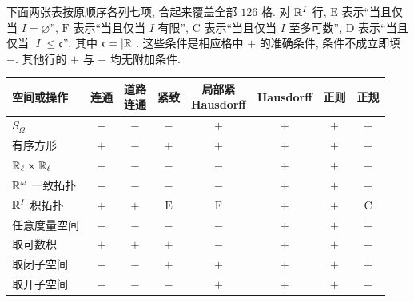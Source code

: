 \begin{solution}
下面两张表按原顺序各列七项, 合起来覆盖全部 $126$ 格. 对 $\mathbb R^I$ 行, $\mathrm E$ 表示“当且仅当 $I=\varnothing$”, $\mathrm F$ 表示“当且仅当 $I$ 有限”, $\mathrm C$ 表示“当且仅当 $I$ 至多可数”, $\mathrm D$ 表示“当且仅当 $|I|\le\mathfrak c$”, 其中 $\mathfrak c=|\mathbb R|$. 这些条件是相应格中 $+$ 的准确条件, 条件不成立即填 $-$. 其他行的 $+$ 与 $-$ 均无附加条件.

\begin{center}
\setlength{\tabcolsep}{4pt}
\begin{tabular}{lccccccc}
\hline
空间或操作 & 连通 & \shortstack{道路\\连通} & 紧致 & \shortstack{局部紧\\Hausdorff} & Hausdorff & 正则 & 正规\\
\hline
$S_\Omega$ & $-$ & $-$ & $-$ & $+$ & $+$ & $+$ & $+$\\
有序方形 & $+$ & $-$ & $+$ & $+$ & $+$ & $+$ & $+$\\
$\mathbb R_\ell\times\mathbb R_\ell$ & $-$ & $-$ & $-$ & $-$ & $+$ & $+$ & $-$\\
$\mathbb R^\omega$ 一致拓扑 & $-$ & $-$ & $-$ & $-$ & $+$ & $+$ & $+$\\
$\mathbb R^I$ 积拓扑 & $+$ & $+$ & $\mathrm E$ & $\mathrm F$ & $+$ & $+$ & $\mathrm C$\\
任意度量空间 & $-$ & $-$ & $-$ & $-$ & $+$ & $+$ & $+$\\
取可数积 & $+$ & $+$ & $+$ & $-$ & $+$ & $+$ & $-$\\
取闭子空间 & $-$ & $-$ & $+$ & $+$ & $+$ & $+$ & $+$\\
取开子空间 & $-$ & $-$ & $-$ & $+$ & $+$ & $+$ & $-$\\
\hline
\end{tabular}
\end{center}


\end{solution}

